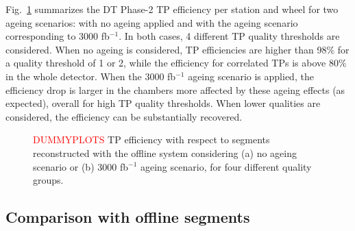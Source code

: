 \documentclass[../main.tex]{subfiles}
\begin{document}
Fig.~\ref{dts:fig:efficiency} summarizes the DT Phase-2 TP efficiency per station and wheel for two ageing scenarios: with no ageing applied and with the ageing scenario corresponding to 3000 fb${}^{-1}$. In both cases, 4 different TP quality thresholds are considered. When no ageing is considered, TP efficiencies are higher than 98$\%$ for a quality threshold of 1 or 2, while the efficiency for correlated TPs is above 80$\%$ in the whole detector. When the 3000 fb${}^{-1}$ ageing scenario is applied, the efficiency drop is larger in the chambers more affected by these ageing effects (as expected), overall for high TP quality thresholds. When lower qualities are considered, the efficiency can be substantially recovered.


\begin{figure}[h!]

\begin{center}
\end{center}
\caption{\textcolor{red}{DUMMYPLOTS} TP efficiency with respect to segments reconstructed with the offline system considering (a) no ageing scenario or (b) 3000 fb${}^{-1}$ ageing scenario, for four different quality groups.}
\label{dts:fig:efficiency}
\end{figure}


\subsection{Comparison with offline segments}






\end{document}
